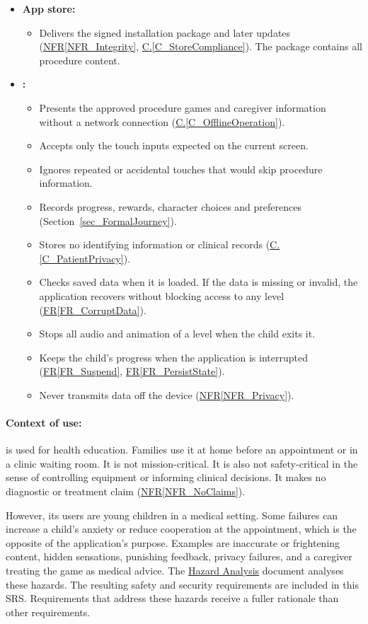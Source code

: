 \documentclass[12pt]{article}
\newcommand{\conref}[1]{\hyperref[#1]{C.\ref*{#1}}}
\newcommand{\rref}[1]{\hyperref[#1]{FR\ref*{#1}}}
\newcommand{\nfrref}[1]{\hyperref[#1]{NFR\ref*{#1}}}
\newcommand{\haurl}{https://team-hindsight.github.io/ophthamology-game/HazardAnalysis/HazardAnalysis.pdf}
\newcommand{\hadoc}[1]{\href{\haurl}{#1}}
\begin{document}
\begin{itemize}
\item \textbf{App store:}
  \begin{itemize}
  \item Delivers the signed installation package and later updates
    (\nfrref{NFR_Integrity}, \conref{C_StoreCompliance}). The package contains
    all procedure content.
  \end{itemize}

\item \textbf{\progname{}:}
  \begin{itemize}
  \item Presents the approved procedure games and caregiver information without
    a network connection (\conref{C_OfflineOperation}).
  \item Accepts only the touch inputs expected on the current screen.
  \item Ignores repeated or accidental touches that would skip procedure
    information.
  \item Records progress, rewards, character choices and preferences
    (Section~\ref{sec_FormalJourney}).
  \item Stores no identifying information or clinical records
    (\conref{C_PatientPrivacy}).
  \item Checks saved data when it is loaded. If the data is missing or invalid,
    the application recovers without blocking access to any level
    (\rref{FR_CorruptData}).
  \item Stops all audio and animation of a level when the child exits it.
  \item Keeps the child's progress when the application is interrupted
    (\rref{FR_Suspend}, \rref{FR_PersistState}).
  \item Never transmits data off the device (\nfrref{NFR_Privacy}).
  \end{itemize}
\end{itemize}

\paragraph{Context of use:} \progname{} is used for health education. Families
use it at home before an appointment or in a clinic waiting room. It is not
mission-critical. It is also not safety-critical in the sense of controlling
equipment or informing clinical decisions. It makes no diagnostic or treatment
claim (\nfrref{NFR_NoClaims}).

However, its users are young children in a medical setting. Some failures can
increase a child's anxiety or reduce cooperation at the appointment, which is
the opposite of the application's purpose. Examples are inaccurate or
frightening content, hidden sensations, punishing feedback, privacy failures,
and a caregiver treating the game as medical advice. The
\hadoc{Hazard Analysis} document analyses these hazards. The resulting safety and security requirements
are included in this SRS. Requirements that address these hazards receive a
fuller rationale than other requirements.
\end{document}

